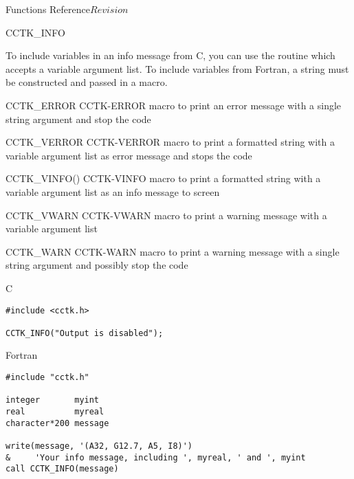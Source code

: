 \begin{cactuspart}{ Functions Reference}{}{$Revision$}
\begin{FunctionDescription}{CCTK\_INFO}
\begin{Discussion}
To include variables in an info message from C, you can use the routine
 which accepts a variable argument list.
To include variables from Fortran, a string must be constructed and passed
in a  macro.
\end{Discussion}

\begin{SeeAlsoSection}
\begin{SeeAlso2} {CCTK\_ERROR} {CCTK-ERROR}
macro to print an error message with a single string argument and stop
the code
\end{SeeAlso2}
\begin{SeeAlso2} {CCTK\_VERROR} {CCTK-VERROR}
macro to print a formatted string with a variable argument list as error
message and stops the code
\end{SeeAlso2}
\begin{SeeAlso2} {CCTK\_VINFO()} {CCTK-VINFO}
macro to print a formatted string with a variable argument list as an
info message to screen
\end{SeeAlso2}
\begin{SeeAlso2} {CCTK\_VWARN} {CCTK-VWARN}
macro to print a warning message with a variable argument list
\end{SeeAlso2}
\begin{SeeAlso2} {CCTK\_WARN} {CCTK-WARN}
macro to print a warning message with a single string argument and
possibly stop the code
\end{SeeAlso2}
\end{SeeAlsoSection}

\begin{ExampleSection}
\begin{Example}{C}
\begin{verbatim}
#include <cctk.h>

CCTK_INFO("Output is disabled");
\end{verbatim}
\end{Example}
\begin{Example}{Fortran}
\begin{verbatim}
#include "cctk.h"

integer       myint
real          myreal
character*200 message

write(message, '(A32, G12.7, A5, I8)')
&     'Your info message, including ', myreal, ' and ', myint
call CCTK_INFO(message)
\end{verbatim}
\end{Example}
\end{ExampleSection}
\end{FunctionDescription}


\end{cactuspart}
